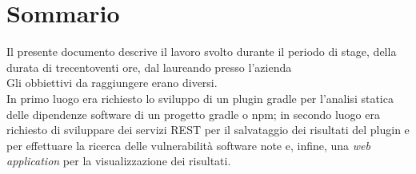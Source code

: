 \cleardoublepage
{}
{}
\begingroup
\let\clearpage\relax
\let\cleardoublepage\relax
\let\cleardoublepage\relax

\chapter*{Sommario}

Il presente documento descrive il lavoro svolto durante il periodo di stage, della durata di trecentoventi ore, dal laureando {\myName} presso l'azienda {\azienda} \\
Gli obbiettivi da raggiungere erano diversi.\\
In primo luogo era richiesto lo sviluppo di un plugin gradle per l'analisi statica delle dipendenze software di un progetto gradle o npm;
in secondo luogo era richiesto di sviluppare dei servizi REST per il salvataggio dei risultati del plugin e per effettuare la ricerca
delle vulnerabilità software note e, infine,
una \textit{web application} per la visualizzazione dei risultati.\\




\endgroup

\vfill
